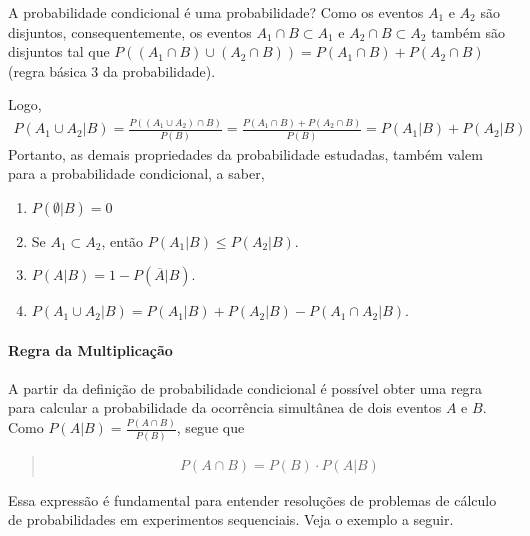 \begin{example} {A probabilidade condicional é uma probabilidade?}
Como os eventos \(A_1\) e \(A_2\) são disjuntos, consequentemente, os eventos \(A_1\cap B\subset A_1\) e \(A_2\cap B\subset A_2\)  também são disjuntos tal que \(P((A_1\cap B)\cup(A_2\cap B))=P(A_1\cap B)+P(A_2\cap B)\) (regra básica 3 da probabilidade).

Logo,
\begin{equation*}
\begin{split}P(A_1\cup A_2|B)=\frac{P((A_1\cup A_2)\cap B)}{P(B)}=\frac{P(A_1\cap B)+P(A_2\cap B)}{P(B)}=P(A_1|B)+P(A_2|B)\end{split}
\end{equation*}
Portanto, as demais propriedades da probabilidade estudadas, também valem para a probabilidade condicional, a saber,
\begin{enumerate}
\item {} 
\(P(\emptyset |B)=0\)

\item {} 
Se \(A_1\subset A_2\),  então \(P(A_1|B)\leq P(A_2|B)\).

\item {} 
\(P(A|B)=1-P(\overline{A}|B)\).

\item {} 
\(P(A_1 \cup A_2|B)=P(A_1|B)+P(A_2|B)-P(A_1\cap A_2|B)\).

\end{enumerate}
\end{example}


\paragraph{Regra da Multiplicação}

A partir da definição de probabilidade condicional é possível obter uma regra para calcular a probabilidade da ocorrência simultânea de dois eventos \(A\)  e \(B\). Como \(\displaystyle{P(A|B)=\frac{P(A\cap B)}{P(B)}}\), segue que
\begin{quote}
\begin{equation*}
\begin{split}P(A\cap B)=P(B)\cdot P(A|B)\end{split}
\end{equation*}\end{quote}

Essa expressão é fundamental para entender resoluções de problemas de cálculo de probabilidades em experimentos sequenciais. Veja o exemplo a seguir.

